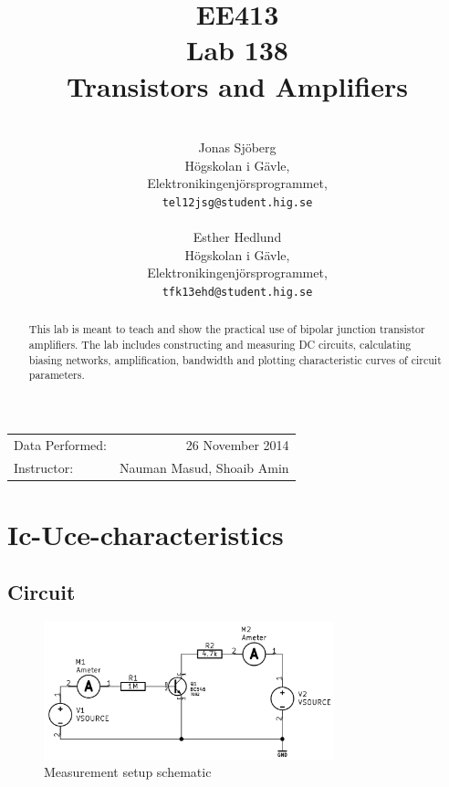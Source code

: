 \documentclass[11pt,a4paper]{article}
\title{EE413 \\ Lab 138 \\ Transistors and Amplifiers}
\author{\\
  Jonas Sjöberg\\
  Högskolan i Gävle,\\
  Elektronikingenjörsprogrammet,\\
  \texttt{tel12jsg@student.hig.se}\\
  \\
  Esther Hedlund\\
  Högskolan i Gävle,\\
  Elektronikingenjörsprogrammet,\\
  \texttt{tfk13ehd@student.hig.se}\\}
\date{}
\begin{document}
\maketitle

\begin{center}
\begin{tabular}{l r}
    Data Performed: & 26 November 2014 \\
    Instructor: & Nauman Masud, Shoaib Amin
\end{tabular}
\end{center}

\begin{abstract}
This lab is meant to teach and show the practical use of bipolar junction transistor amplifiers. The lab includes constructing and measuring DC circuits, calculating biasing networks, amplification, bandwidth and plotting characteristic curves of circuit parameters.
\end{abstract}

\newpage

{
\hypersetup{ 
	colorlinks=true,
	citecolor=black,
	filecolor=black,
	linkcolor=black,
	urlcolor=black
}
\setcounter{tocdepth}{3}
\tableofcontents
}

\newpage

\section{Ic-Uce-characteristics}\label{ic-uce-characteristics}

\subsection{Circuit}\label{circuit}

\begin{figure}[htbp]
    \centering
    \includegraphics[width=0.75\textwidth]{img/ic-uce_schem}
    \caption{Measurement setup schematic}
    \label{fig:ic-uce_schem}
\end{figure}
\end{document}
